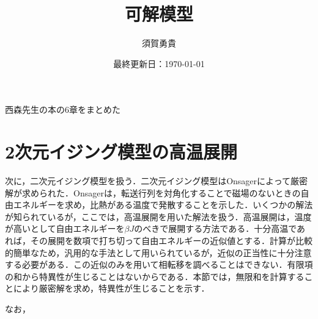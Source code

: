 \documentclass[a4paper,11pt]{jsarticle}
\begin{document}
\title{可解模型}
\author{須賀勇貴}
\date{最終更新日：\today}
\maketitle
西森先生の本の6章をまとめた

\section{2次元イジング模型の高温展開}
次に，二次元イジング模型を扱う．二次元イジング模型はOnsagerによって厳密解が求められた．Onsagerは，転送行列を対角化することで磁場のないときの自由エネルギーを求め，比熱がある温度で発散することを示した．いくつかの解法が知られているが，ここでは，高温展開を用いた解法を扱う．高温展開は，温度が高いとして自由エネルギーを$\beta J$のべきで展開する方法である．十分高温であれば，その展開を数項で打ち切って自由エネルギーの近似値とする．計算が比較的簡単なため，汎用的な手法として用いられているが，近似の正当性に十分注意する必要がある．この近似のみを用いて相転移を調べることはできない．有限項の和から特異性が生じることはないからである．本節では，無限和を計算することにより厳密解を求め，特異性が生じることを示す．\par
なお，
\end{document}
